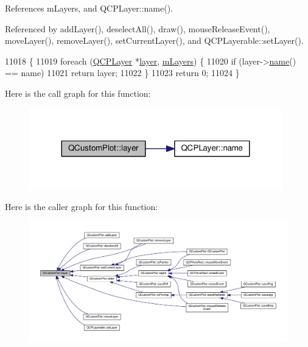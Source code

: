 References m\+Layers, and Q\+C\+P\+Layer\+::name().



Referenced by add\+Layer(), deselect\+All(), draw(), mouse\+Release\+Event(), move\+Layer(), remove\+Layer(), set\+Current\+Layer(), and Q\+C\+P\+Layerable\+::set\+Layer().


\begin{DoxyCode}
11018                                                       \{
11019   \textcolor{keywordflow}{foreach} (\hyperlink{class_q_c_p_layer}{QCPLayer} *\hyperlink{class_q_custom_plot_aac492da01782820454e9136a8db28182}{layer}, \hyperlink{class_q_custom_plot_a9685e7ec1ef5e6066dd7d91bb3a698b3}{mLayers}) \{
11020     \textcolor{keywordflow}{if} (layer->\hyperlink{class_q_c_p_layer_a96ebd1e436f3813938cb9cd4a59a60be}{name}() == name)
11021       \textcolor{keywordflow}{return} layer;
11022   \}
11023   \textcolor{keywordflow}{return} 0;
11024 \}
\end{DoxyCode}


Here is the call graph for this function\+:\nopagebreak
\begin{figure}[H]
\begin{center}
\leavevmode
\includegraphics[width=311pt]{class_q_custom_plot_aac492da01782820454e9136a8db28182_cgraph}
\end{center}
\end{figure}




Here is the caller graph for this function\+:\nopagebreak
\begin{figure}[H]
\begin{center}
\leavevmode
\includegraphics[width=350pt]{class_q_custom_plot_aac492da01782820454e9136a8db28182_icgraph}
\end{center}
\end{figure}


